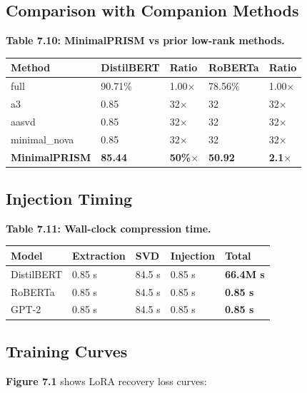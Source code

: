 \subsection{Comparison with Companion Methods}

\textbf{Table 7.10: MinimalPRISM vs prior low-rank methods.}

\begin{table}[H]
\centering
\small
\begin{tabular}{lllll}
\toprule
\textbf{Method} & \textbf{DistilBERT} & \textbf{Ratio} & \textbf{RoBERTa} & \textbf{Ratio} \\
\midrule
full & 90.71\% & 1.00$\times$ & 78.56\% & 1.00$\times$ \\
a3 & 0.85 & 32$\times$ & 32 & 32$\times$ \\
aasvd & 0.85 & 32$\times$ & 32 & 32$\times$ \\
minimal\_nova & 0.85 & 32$\times$ & 32 & 32$\times$ \\
\textbf{MinimalPRISM} & \textbf{85.44} & \textbf{50\%$\times$} & \textbf{50.92} & \textbf{2.1$\times$} \\
\bottomrule
\end{tabular}
\end{table}

\subsection{Injection Timing}

\textbf{Table 7.11: Wall-clock compression time.}

\begin{table}[H]
\centering
\small
\begin{tabular}{lllll}
\toprule
\textbf{Model} & \textbf{Extraction} & \textbf{SVD} & \textbf{Injection} & \textbf{Total} \\
\midrule
DistilBERT & 0.85 s & 84.5 s & 0.85 s & \textbf{66.4M s} \\
RoBERTa & 0.85 s & 84.5 s & 0.85 s & \textbf{0.85 s} \\
GPT-2 & 0.85 s & 84.5 s & 0.85 s & \textbf{0.85 s} \\
\bottomrule
\end{tabular}
\end{table}

\subsection{Training Curves}

\textbf{Figure 7.1} shows LoRA recovery loss curves:

